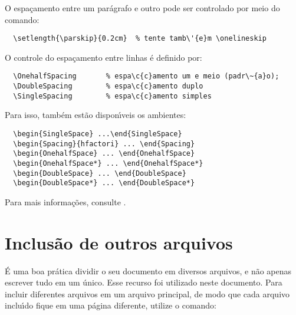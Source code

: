 O espa\c{c}amento entre um par\'{a}grafo e outro
pode ser controlado por meio do comando:

\begin{verbatim}
  \setlength{\parskip}{0.2cm}  % tente tamb\'{e}m \onelineskip
\end{verbatim}

O controle do espa\c{c}amento entre linhas \'{e}
definido por:

\begin{verbatim}
  \OnehalfSpacing       % espa\c{c}amento um e meio (padr\~{a}o);
  \DoubleSpacing        % espa\c{c}amento duplo
  \SingleSpacing        % espa\c{c}amento simples	
\end{verbatim}

Para isso, tamb\'{e}m est\~{a}o dispon\'{\i}veis os ambientes:

\begin{verbatim}
  \begin{SingleSpace} ...\end{SingleSpace}
  \begin{Spacing}{hfactori} ... \end{Spacing}
  \begin{OnehalfSpace} ... \end{OnehalfSpace}
  \begin{OnehalfSpace*} ... \end{OnehalfSpace*}
  \begin{DoubleSpace} ... \end{DoubleSpace}
  \begin{DoubleSpace*} ... \end{DoubleSpace*}
\end{verbatim}

Para mais informa\c{c}\~{o}es, consulte .

\section{Inclus\~{a}o de outros arquivos}\label{sec-include}

\'{E} uma boa pr\'{a}tica dividir o seu documento em diversos arquivos, e n\~{a}o
apenas escrever tudo em um \'{u}nico. Esse recurso foi utilizado neste
documento. Para incluir diferentes arquivos em um arquivo principal,
de modo que cada arquivo inclu\'{\i}do fique em uma p\'{a}gina diferente, utilize o
comando:

